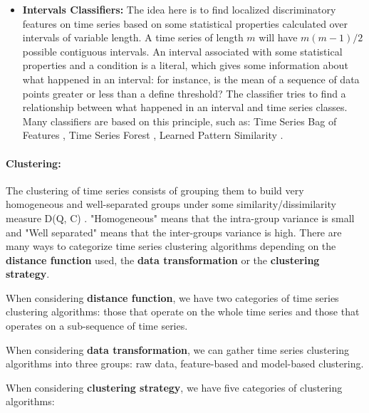 \begin{itemize}
\item \textbf{Intervals Classifiers:} The idea here is to find localized discriminatory features on time series based on some statistical properties calculated over intervals of variable length. A time series of length $m$ will have $ m(m-1)/2$ possible contiguous intervals. An interval associated with some statistical properties and a condition is a literal, which gives some information about what happened in an interval: for instance, is the mean of a sequence of data points greater or less than a define threshold? The classifier tries to find a relationship between what happened in an interval and  time series classes. Many classifiers are based on this principle, such as: Time Series Bag of Features  \cite{baydogan2013bag}, Time Series Forest  \cite{deng2013time}, Learned Pattern Similarity  \cite{baydogan2016time}.
\end{itemize}


\paragraph{Clustering:}
The clustering of time series consists of grouping them to build very homogeneous and well-separated groups under some similarity/dissimilarity measure D(Q, C) \cite{rani2012recent}. "Homogeneous" means that the intra-group variance is small and "Well separated" means that the inter-groups variance is high. There are many ways to categorize time series clustering algorithms depending on the \textbf{distance function} used, the \textbf{data transformation} or  the \textbf{clustering strategy}. 


When considering \textbf{distance function}, we have two categories of time series clustering algorithms: those that operate on the whole time series and those that operates on a sub-sequence of time series.


 When considering \textbf{data transformation}, we can  gather time series clustering algorithms into three groups:  raw data, feature-based and model-based clustering. 


When considering \textbf{clustering strategy}, we have five categories of clustering algorithms: 

